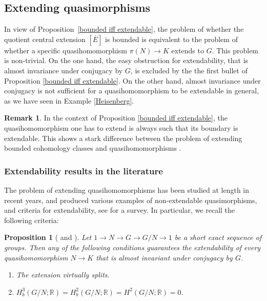 \documentclass[svgnames]{amsart}
\theoremstyle{plain}
\newtheorem{prop}[thm]{Proposition}
\theoremstyle{definition}
\newtheorem{rem}[thm]{Remark}
\begin{document}
\subsection{Extending quasimorphisms}
In view of Proposition~\ref{bounded iff extendable}, the problem of whether the quotient central extension $[\overline{E}]$ is bounded is equivalent to the problem of whether a specific quasihomomorphism $\pi(N) \to K$ extends to $G$. This problem is non-trivial. On the one hand, the easy obstruction for extendability, that is almost invariance under conjugacy by $G$, is excluded by the the first bullet of Proposition \ref{bounded iff extendable}. On the other hand, almost invariance under conjugacy is not sufficient for a quasihomomorphism to be extendable in general, as we have seen in Example \ref{Heisenberg}. 

\begin{rem}\label{rem:extendable_boundary}
    In the context of Proposition \ref{bounded iff extendable}, the quasihomomorphism one has to extend is always such that its boundary is extendable. This shows a stark difference between the problem of extending bounded cohomology classes and quasihomomorphisms \cite[end of Section 1.3]{extendable:survey}.
\end{rem}

\subsubsection{Extendability results in the literature}
The problem of extending quasihomomorphisms has been studied at length in recent years, and produced various examples of non-extendable quasimorphisms, and criteria for extendability, see \cite{extendable:survey} for a survey. In particular, we recall the following criteria:

\begin{prop}[{\cite[Proposition 1.6]{extendable:bavard}} and {\cite[Theorem 1.9]{extendable:main}}]\label{thm:bavard}
    Let $1 \to N \to G \to G/N \to 1$ be a short exact sequence of groups. Then any of the following conditions guarantees the extendability of every quasihomomorphism $N \to K$ that is almost invariant under conjugacy by $G$.
    \begin{enumerate}
        \item The extension virtually splits.
        \item $H^3_b(G/N; \mathbb{R}) = H^2_b(G/N; \mathbb{R}) = H^2(G/N; \mathbb{R}) = 0$.
    \end{enumerate}
\end{prop}
\end{document}
